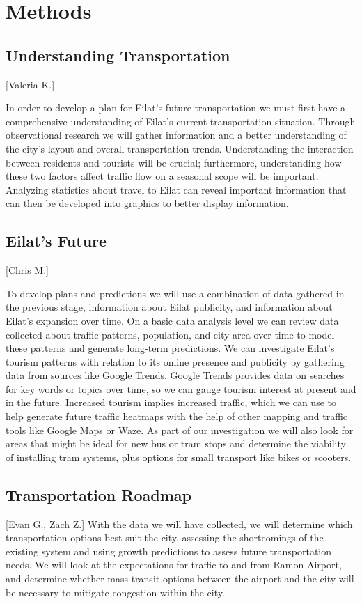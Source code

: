 \documentclass[12pt]{article}                         %
\begin{document}
\newpage
\section{Methods}

\subsection{Understanding Transportation}[Valeria K.]

In order to develop a plan for Eilat's future transportation we must first have a comprehensive understanding of Eilat's current transportation situation. Through observational research we will gather information and a better understanding of the city's layout and overall transportation trends. Understanding the interaction between residents and tourists will be crucial; furthermore, understanding how these two factors affect traffic flow on a seasonal scope will be important. Analyzing statistics about travel to Eilat can reveal important information that can then be developed into graphics to better display information.

\subsection{Eilat's Future}[Chris M.]

To develop plans and predictions we will use a combination of data gathered in the previous stage, information about Eilat publicity, and information about Eilat's expansion over time. On a basic data analysis level we can review data collected about traffic patterns, population, and city area over time to model these patterns and generate long-term predictions. We can investigate Eilat's tourism patterns with relation to its online presence and publicity by gathering data from sources like Google Trends. Google Trends provides data on searches for key words or topics over time, so we can gauge tourism interest at present and in the future. Increased tourism implies increased traffic, which we can use to help generate future traffic heatmaps with the help of other mapping and traffic tools like Google Maps or Waze. As part of our investigation we will also look for areas that might be ideal for new bus or tram stops and determine the viability of installing tram systems, plus options for small transport like bikes or scooters.

\subsection{Transportation Roadmap}[Evan G., Zach Z.]
With the data we will have collected, we will determine which transportation options best suit the city, assessing the shortcomings of the existing system and using growth predictions to assess future transportation needs. We will look at the expectations for traffic to and from Ramon Airport, and determine whether mass transit options between the airport and the city will be necessary to mitigate congestion within the city.
\end{document}
